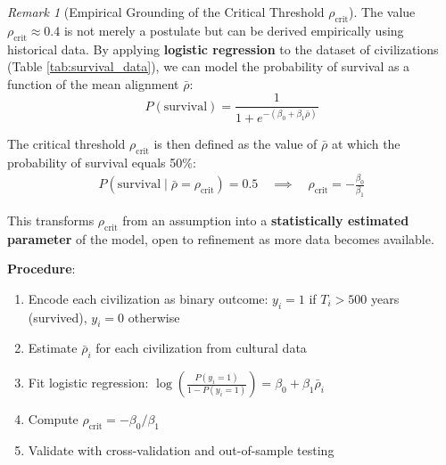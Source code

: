 \documentclass[11pt,a4paper]{article}
\theoremstyle{definition}
\theoremstyle{remark}
\newtheorem{remark}{Remark}[section]
\begin{document}
\begin{remark}[Empirical Grounding of the Critical Threshold \(\rho_{\text{crit}}\)]
The value \(\rho_{\text{crit}} \approx 0.4\) is not merely a postulate but can be derived empirically using historical data. By applying \textbf{logistic regression} to the dataset of civilizations (Table \ref{tab:survival_data}), we can model the probability of survival as a function of the mean alignment \(\bar{\rho}\):
\begin{equation}
P(\text{survival}) = \frac{1}{1 + e^{-(\beta_0 + \beta_1 \bar{\rho})}}
\end{equation}

The critical threshold \(\rho_{\text{crit}}\) is then defined as the value of \(\bar{\rho}\) at which the probability of survival equals 50\%:
\begin{align}
P(\text{survival} \mid \bar{\rho} = \rho_{\text{crit}}) = 0.5 \quad \implies \quad \rho_{\text{crit}} = -\frac{\beta_0}{\beta_1}
\end{align}

This transforms \(\rho_{\text{crit}}\) from an assumption into a \textbf{statistically estimated parameter} of the model, open to refinement as more data becomes available.

\textbf{Procedure}:
\begin{enumerate}
    \item Encode each civilization as binary outcome: \(y_i = 1\) if \(T_i > 500\) years (survived), \(y_i = 0\) otherwise
    \item Estimate \(\bar{\rho}_i\) for each civilization from cultural data
    \item Fit logistic regression: \(\log\left(\frac{P(y_i=1)}{1-P(y_i=1)}\right) = \beta_0 + \beta_1 \bar{\rho}_i\)
    \item Compute \(\rho_{\text{crit}} = -\beta_0/\beta_1\)
    \item Validate with cross-validation and out-of-sample testing
\end{enumerate}
\end{remark}
\end{document}
